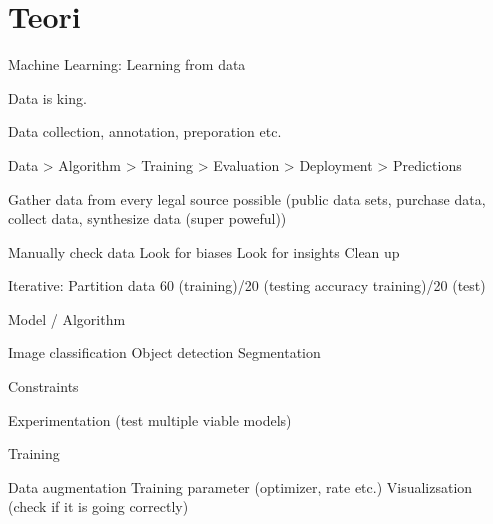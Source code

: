 


\section{Teori}

Machine Learning: Learning from data

Data is king.

Data collection, annotation, preporation etc.

Data > Algorithm > Training > Evaluation > Deployment > Predictions

	Gather data from every legal source possible (public data sets, purchase data, collect data, synthesize data (super poweful))

	Manually check data
	Look for biases
	Look for insights
	Clean up

	Iterative: Partition data 60 (training)/20 (testing accuracy training)/20 (test)

Model / Algorithm

	Image classification
	Object detection
	Segmentation

	Constraints

	Experimentation (test multiple viable models)

Training

	Data augmentation
	Training parameter (optimizer, rate etc.)
	Visualizsation (check if it is going correctly)

